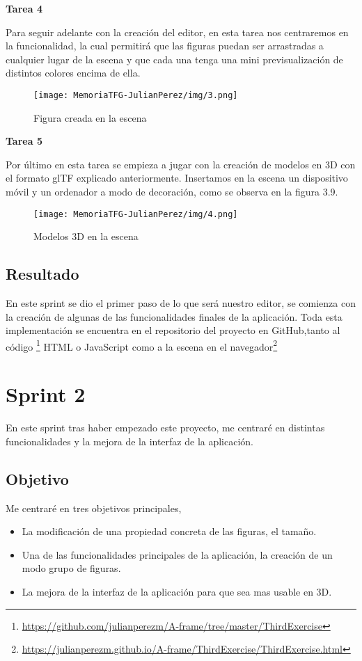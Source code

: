\documentclass[a4paper, 12pt]{book}
\begin{document}
\textbf{Tarea 4}

Para seguir adelante con la creación del editor, en esta tarea nos centraremos en la funcionalidad, la cual permitirá que las figuras puedan ser arrastradas a cualquier lugar de la escena y que cada una tenga una mini previsualización de distintos colores encima de ella.          
\begin{figure}[H]
  \centering
  \texttt{[image: MemoriaTFG-JulianPerez/img/3.png]}
  \caption{Figura creada en la escena}\label{scrum}
\end{figure}

\textbf{Tarea 5}

Por último en esta tarea se empieza a jugar con la creación de modelos en 3D con el formato glTF explicado anteriormente. Insertamos en la escena un dispositivo móvil y un ordenador a modo de decoración, como se observa en la figura 3.9.
\begin{figure}[H]
  \centering
  \texttt{[image: MemoriaTFG-JulianPerez/img/4.png]}
  \caption{Modelos 3D en la escena}\label{scrum}
\end{figure}

\subsection{Resultado}
En este sprint se dio el primer paso de lo que será nuestro editor, se comienza con la creación de algunas de las funcionalidades finales de la aplicación. Toda esta implementación se encuentra en el repositorio del proyecto en GitHub,tanto al código \footnote{\url{https://github.com/julianperezm/A-frame/tree/master/ThirdExercise}} HTML o JavaScript como a la escena en el navegador\footnote{\url{https://julianperezm.github.io/A-frame/ThirdExercise/ThirdExercise.html}}

\section{Sprint 2}
En este sprint tras haber empezado este proyecto, me centraré en distintas funcionalidades y la mejora de la interfaz de la aplicación.

\subsection{Objetivo}
Me centraré en tres objetivos principales, 

\begin{itemize}
    \item La modificación de una propiedad concreta de las figuras, el tamaño.
    \item Una de las funcionalidades principales de la aplicación, la creación de un modo grupo de figuras.
    \item La mejora de la interfaz de la aplicación para que sea mas usable en 3D.
\end{itemize}
\end{document}
